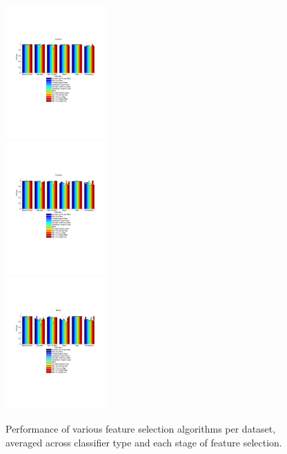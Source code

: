\begin{figure}[tbp!]
\centering
\includegraphics[width=0.35\textwidth]{../ResultsPlot/BarGraphs/dataSetXFeatureSelection_avgCl/Accuracy.pdf}\\
\includegraphics[width=0.35\textwidth]{../ResultsPlot/BarGraphs/dataSetXFeatureSelection_avgCl/Precision.pdf}\\
\includegraphics[width=0.35\textwidth]{../ResultsPlot/BarGraphs/dataSetXFeatureSelection_avgCl/Recall.pdf}
\caption{\footnotesize Performance of various feature selection algorithms per dataset, averaged across classifier type and each stage of feature selection.}
\label{fig:perf_vs_dataset}
\end{figure}

